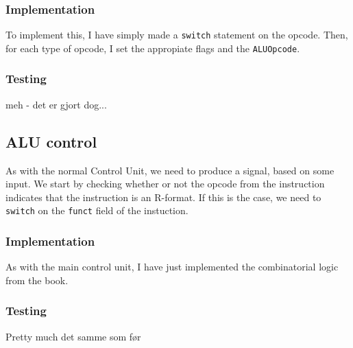 \subsubsection*{Implementation}
To implement this, I have simply made a \texttt{switch} statement on the
opcode. Then, for each type of opcode, I set the appropiate flags and the
\texttt{ALUOpcode}.

\subsubsection*{Testing}
meh - det er gjort dog...

\subsection{ALU control}\label{sec:alu-control}
As with the normal Control Unit, we need to produce a signal, based on some
input. We start by checking whether or not the opcode from the instruction
indicates that the instruction is an R-format. If this is the case, we need to
\texttt{switch} on the \texttt{funct} field of the instuction.

\subsubsection*{Implementation}
As with the main control unit, I have just implemented the combinatorial logic
from the book.

\subsubsection*{Testing}
Pretty much det samme som før

